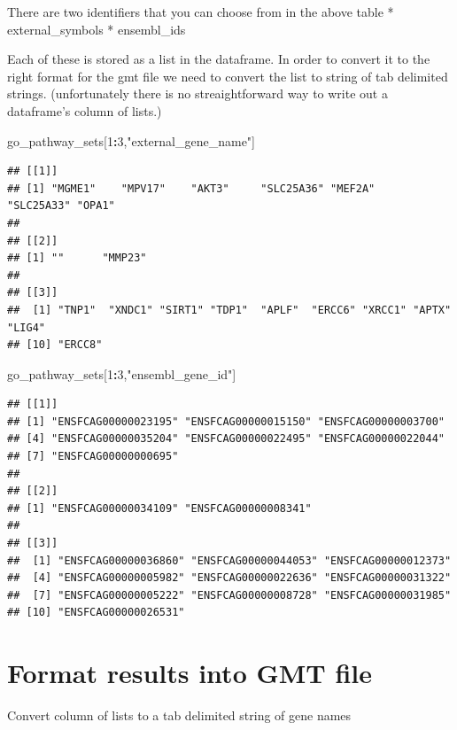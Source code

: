 \documentclass[
]{book}
\newenvironment{Shaded}{\begin{snugshade}}{\end{snugshade}}
\newcommand{\DecValTok}[1]{\textcolor[rgb]{0.00,0.00,0.81}{#1}}
\newcommand{\NormalTok}[1]{#1}
\newcommand{\SpecialCharTok}[1]{\textcolor[rgb]{0.81,0.36,0.00}{\textbf{#1}}}
\newcommand{\StringTok}[1]{\textcolor[rgb]{0.31,0.60,0.02}{#1}}
\begin{document}
There are two identifiers that you can choose from in the above table
* external\_symbols
* ensembl\_ids

Each of these is stored as a list in the dataframe. In order to convert it to the right format for the gmt file we need to convert the list to string of tab delimited strings. (unfortunately there is no streaightforward way to write out a dataframe's column of lists.)

\begin{Shaded}
\begin{Highlighting}[]
\NormalTok{go\_pathway\_sets[}\DecValTok{1}\SpecialCharTok{:}\DecValTok{3}\NormalTok{,}\StringTok{"external\_gene\_name"}\NormalTok{]}
\end{Highlighting}
\end{Shaded}

\begin{verbatim}
## [[1]]
## [1] "MGME1"    "MPV17"    "AKT3"     "SLC25A36" "MEF2A"    "SLC25A33" "OPA1"    
## 
## [[2]]
## [1] ""      "MMP23"
## 
## [[3]]
##  [1] "TNP1"  "XNDC1" "SIRT1" "TDP1"  "APLF"  "ERCC6" "XRCC1" "APTX"  "LIG4" 
## [10] "ERCC8"
\end{verbatim}

\begin{Shaded}
\begin{Highlighting}[]
\NormalTok{go\_pathway\_sets[}\DecValTok{1}\SpecialCharTok{:}\DecValTok{3}\NormalTok{,}\StringTok{"ensembl\_gene\_id"}\NormalTok{]}
\end{Highlighting}
\end{Shaded}

\begin{verbatim}
## [[1]]
## [1] "ENSFCAG00000023195" "ENSFCAG00000015150" "ENSFCAG00000003700"
## [4] "ENSFCAG00000035204" "ENSFCAG00000022495" "ENSFCAG00000022044"
## [7] "ENSFCAG00000000695"
## 
## [[2]]
## [1] "ENSFCAG00000034109" "ENSFCAG00000008341"
## 
## [[3]]
##  [1] "ENSFCAG00000036860" "ENSFCAG00000044053" "ENSFCAG00000012373"
##  [4] "ENSFCAG00000005982" "ENSFCAG00000022636" "ENSFCAG00000031322"
##  [7] "ENSFCAG00000005222" "ENSFCAG00000008728" "ENSFCAG00000031985"
## [10] "ENSFCAG00000026531"
\end{verbatim}

\section{Format results into GMT file}\label{format-results-into-gmt-file}

Convert column of lists to a tab delimited string of gene names
\end{document}
